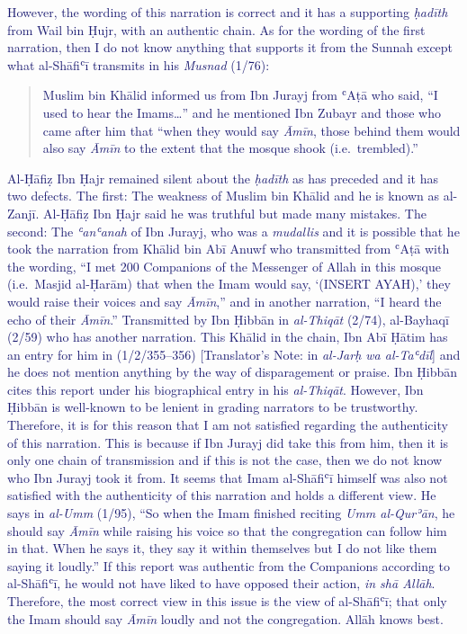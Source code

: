 \textcolor{MidnightBlue}{However, the wording of this narration is correct and it has a
  supporting \emph{ḥadīth} from Wail bin Ḥujr, with an authentic chain. As
  for the wording of the first narration, then I do not know anything that
  supports it from the Sunnah except what al-Shāfiʿī transmits in his
  \emph{Musnad} (1/76):}
  
  \begin{quote}
    \textcolor{MidnightBlue}{Muslim bin Khālid informed us from Ibn Jurayj from ʿAṭā who said, ``I
    used to hear the Imams\ldots{}'' and he mentioned Ibn Zubayr and those
    who came after him that ``when they would say \emph{Āmīn}, those behind
    them would also say \emph{Āmīn} to the extent that the mosque shook
    (i.e.~trembled).''}
  \end{quote}

\textcolor{MidnightBlue}{Al-Ḥāfiẓ Ibn Ḥajr remained silent about the \emph{ḥadīth} as has
  preceded and it has two defects. The first: The weakness of Muslim bin
  Khālid and he is known as al-Zanjī. Al-Ḥāfiẓ Ibn Ḥajr said he was
  truthful but made many mistakes. The second: The \emph{ʿanʿanah} of Ibn
  Jurayj, who was a \emph{mudallis} and it is possible that he took the
  narration from Khālid bin Abī Anuwf who transmitted from ʿAṭā with the
  wording, ``I met 200 Companions of the Messenger of Allah \pbuh in this
  mosque (i.e.~Masjid al-Ḥarām) that when the Imam would say, `(INSERT
  AYAH),' they would raise their voices and say \emph{Āmīn},'' and in
  another narration, ``I heard the echo of their \emph{Āmīn}.''
  Transmitted by Ibn Ḥibbān in \emph{al-Thiqāt} (2/74), al-Bayhaqī (2/59)
  who has another narration. This Khālid in the chain, Ibn Abī Ḥātim has
  an entry for him in (1/2/355--356) {[}Translator's Note: in
  \emph{al-Jarḥ wa al-Taʿdīl}{]} and he does not mention anything by the
  way of disparagement or praise. Ibn Ḥibbān cites this report under his
  biographical entry in his \emph{al-Thiqāt}. However, Ibn Ḥibbān is
  well-known to be lenient in grading narrators to be trustworthy.
  Therefore, it is for this reason that I am not satisfied regarding the
  authenticity of this narration. This is because if Ibn Jurayj did take
  this from him, then it is only one chain of transmission and if this is
  not the case, then we do not know who Ibn Jurayj took it from. It seems
  that Imam al-Shāfiʿī himself was also not satisfied with the
  authenticity of this narration and holds a different view. He says in
  \emph{al-Umm} (1/95), ``So when the Imam finished reciting \emph{Umm
    al-Qurʾān}, he should say \emph{Āmīn} while raising his voice so that
  the congregation can follow him in that. When he says it, they say it
  within themselves but I do not like them saying it loudly.'' If this
  report was authentic from the Companions according to al-Shāfiʿī, he
  would not have liked to have opposed their action, \emph{in shā Allāh}.
  Therefore, the most correct view in this issue is the view of
  al-Shāfiʿī; that only the Imam should say \emph{Āmīn} loudly and not the
  congregation. Allāh knows best.} %

